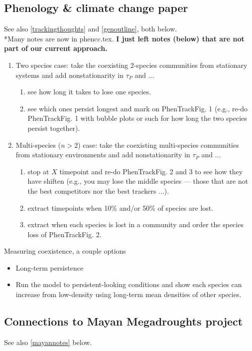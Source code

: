 \documentclass[11pt,a4paper,oneside]{article}
\newenvironment{smitemize}{
\begin{itemize}
  \setlength{\itemsep}{1pt}
  \setlength{\parskip}{0pt}
  \setlength{\parsep}{0pt}}
{\end{itemize}
}
\begin{document}
\subsection{Phenology \& climate change paper}\label{phenCCpaper}
See also \ref{trackingthoughts} and \ref{genoutline}, both below.\\

*Many notes are now in phencc.tex. {\bf I just left notes (below) that are not part of our current approach.}

\begin{enumerate}
\item Two species case: take the coexisting 2-species communities from stationary systems and add nonstationarity in $\tau_P$ and ...
\begin{enumerate}
\item see how long it takes to lose one species. 
\item see which ones persist longest and mark on PhenTrackFig. 1 (e.g., re-do PhenTrackFig. 1 with bubble plots or such for how long the two species persist together).
\end{enumerate}
\item Multi-species ($n>2$) case: take the coexisting multi-species communities from stationary environments and add nonstationarity in $\tau_P$ and ...
\begin{enumerate}
\item stop at $X$ timepoint and re-do PhenTrackFig. 2 and 3 to see how they have shiften (e.g., you may lose the middle species --- those that are not the best competitors nor the best trackers ...).
\item extract timepoints when 10\% and/or 50\% of species are lost. 
\item extract when each species is lost in a community and order the species loss of PhenTrackFig. 2.
\end{enumerate}
\end{enumerate}

Measuring coexistence, a couple options
\begin{smitemize}
\item Long-term persistence
\item Run the model to persistent-looking conditions and show each species can increase from low-density using long-term mean densities of other species.
\end{smitemize}

\subsection{Connections to Mayan Megadroughts project}
See also \ref{mayannotes} below.\\
\end{document}
